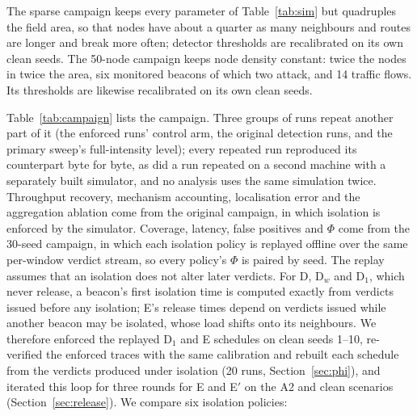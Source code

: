 The sparse campaign keeps every parameter of Table~\ref{tab:sim} but
quadruples the field area, so that nodes have about a quarter as many
neighbours and routes are longer and break more often; detector thresholds
are recalibrated on its own clean seeds. The 50-node campaign keeps node
density constant: twice the nodes in twice the area, six monitored beacons of
which two attack, and 14 traffic flows. Its thresholds are likewise
recalibrated on its own clean seeds.

Table~\ref{tab:campaign} lists the campaign. Three groups of runs repeat
another part of it (the enforced runs' control arm, the original detection
runs, and the primary sweep's full-intensity level); every repeated run
reproduced its counterpart byte for byte, as did a run repeated on a second
machine with a separately built simulator, and no analysis uses the same
simulation twice. Throughput recovery, mechanism accounting, localisation
error and the aggregation ablation come from the original campaign, in which
isolation is enforced by the simulator. Coverage, latency, false positives and
$\Phi$ come from the 30-seed campaign, in which each isolation policy is
replayed offline over the same per-window verdict stream, so every policy's
$\Phi$ is paired by seed. The replay assumes that an isolation does not alter
later verdicts. For D, D$_w$ and D$_1$, which never release, a beacon's first
isolation time is computed exactly from verdicts issued before any isolation;
E's release times depend on verdicts issued while another beacon may be
isolated, whose load shifts onto its neighbours. We therefore enforced the
replayed D$_1$ and E schedules on clean seeds 1--10, re-verified the enforced
traces with the same calibration and rebuilt each schedule from the verdicts
produced under isolation (20 runs, Section~\ref{sec:phi}), and iterated this
loop for three rounds for E and E$'$ on the A2 and clean scenarios
(Section~\ref{sec:release}). We compare six isolation policies:


